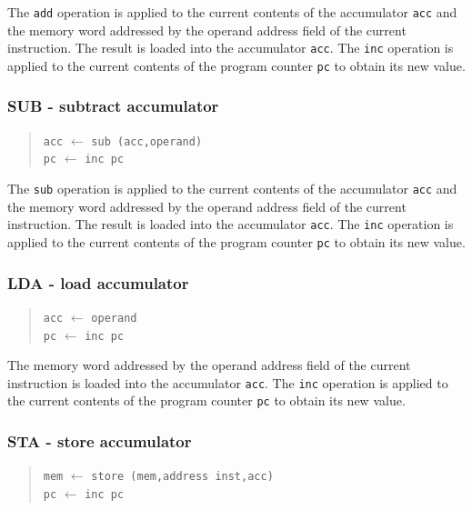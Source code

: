 The \verb"add" operation is applied to the current contents
of the accumulator \verb"acc" and the memory word addressed by the operand
address field of the current instruction. The result is loaded into
the accumulator \verb"acc".
The \verb"inc" operation
is applied to the current contents of the program counter \verb"pc" to
obtain its new value.

\subsubsection*{SUB - subtract accumulator}

\begin{quote}
\verb"acc" $\leftarrow$ \verb"sub (acc,operand)"\\
\verb"pc" $\leftarrow$ \verb"inc pc"
\end{quote}

The \verb"sub" operation is applied to the current contents
of the accumulator \verb"acc" and the memory word addressed by the operand
address field of the current instruction.  The result is loaded into
the accumulator \verb"acc".
The \verb"inc" operation
is applied to the current contents of the program counter \verb"pc" to
obtain its new value.

\subsubsection*{LDA - load accumulator}

\begin{quote}
\verb"acc" $\leftarrow$ \verb"operand"\\
\verb"pc" $\leftarrow$ \verb"inc pc"
\end{quote}

The memory word addressed by the operand
address field of the current instruction is loaded into
the accumulator \verb"acc".
The \verb"inc" operation
is applied to the current contents of the program counter \verb"pc" to
obtain its new value.

\subsubsection*{STA - store accumulator}

\begin{quote}
\verb"mem" $\leftarrow$ \verb"store (mem,address inst,acc)"\\
\verb"pc" $\leftarrow$ \verb"inc pc"
\end{quote}


